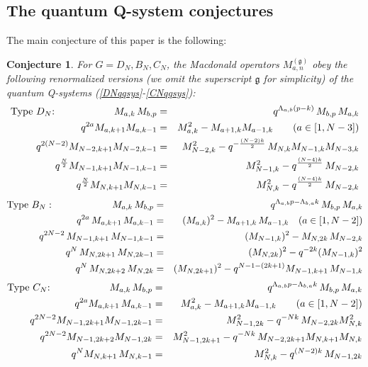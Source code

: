 \documentclass[12pt]{amsart}
\newtheorem{conj}[thm]{Conjecture}
\newcommand{\g}{{\mathfrak{g}}}
\numberwithin{equation}{section}
\numberwithin{table}{section}
\begin{document}
\subsection{The quantum Q-system conjectures}

The main conjecture of this paper is the following:

\begin{conj}\label{qqconj}
For $G=D_N,B_N,C_N$, the Macdonald operators $M_{a,n}^{(\g)}$ obey
the following renormalized versions (we omit the superscript $\g$
for simplicity) of the quantum Q-systems (\ref{DNqqsys}-\ref{CNqqsys}):
\begin{eqnarray}
\hbox{Type $D_N$:}\qquad\qquad\qquad M_{a,k}\, M_{b,p}&=&q^{\Lambda_{a,b}(p-k)}\, M_{b,p}\, M_{a,k}\nonumber \\
q^{2 a}M_{a,k+1}M_{a,k-1}&=&M_{a,k}^2-M_{a+1,k}M_{a-1,k}\qquad (a\in[1,N-3])\nonumber \\
q^{2(N-2)}M_{N-2,k+1}M_{N-2,k-1}&=& M_{N-2,k}^2- q^{-\frac{(N-2)k}{2}}\, M_{N,k}M_{N-1,k}M_{N-3,k}
\label{DMsys} \\
q^{\frac{N}{2}}M_{N-1,k+1}M_{N-1,k-1}&=& M_{N-1,k}^2- q^{\frac{(N-4)k}{2}}\,M_{N-2,k}\nonumber \\
q^{\frac{N}{2}}M_{N,k+1}M_{N,k-1}&=& M_{N,k}^2- q^{\frac{(N-4)k}{2}}\,M_{N-2,k}\nonumber
\end{eqnarray}
\begin{eqnarray}
\hbox{Type $B_N$}:\qquad \qquad\qquad M_{a,k}\, M_{b,p}&=& q^{\Lambda_{a,b} p-\Lambda_{b,a}k}\, M_{b,p}\, M_{a,k}\nonumber \\
q^{2a} \,M_{a,k+1}\,M_{a,k-1}&=&(M_{a,k})^2-M_{a+1,k}\, M_{a-1,k}\quad (a\in [1,N-2])\nonumber \\
q^{2N-2} \,M_{N-1,k+1}\,M_{N-1,k-1}&=&(M_{N-1,k})^2-M_{N,2k}\, M_{N-2,k}\label{BMsysthird} \\
q^N\, M_{N,2k+1}\,M_{N,2k-1}&=& (M_{N,2k})^2 -q^{-2k} (M_{N-1,k})^2\nonumber\\
q^N\, M_{N,2k+2}\,M_{N,2k}&=& (M_{N,2k+1})^2 -q^{N-1-(2k+1)} M_{N-1,k+1}\,M_{N-1,k}\label{BMsyslast}\\
\end{eqnarray}
\begin{eqnarray}
\hbox{Type $C_N$:}\qquad\qquad\qquad M_{a,k}\, M_{b,p}&=&q^{\Lambda_{a,b} p-\Lambda_{b,a}k}\, 
M_{b,p}\,M_{a,k}\nonumber \\
q^{2a} M_{a,k+1}\, M_{a,k-1}&=&M_{a,k}^2- M_{a+1,k}M_{a-1,k} \qquad (a\in[1,N-2])\nonumber \\
q^{2N-2} M_{N-1,2k+1}M_{N-1,2k-1}&=&M_{N-1,2k}^2 - q^{-Nk}\,M_{N-2,2k} M_{N,k}^2\nonumber  \\
q^{2N-2} M_{N-1,2k+2}M_{N-1,2k}&=&M_{N-1,2k+1}^2 - q^{-Nk}\,M_{N-2,2k+1} M_{N,k+1}M_{N,k}\nonumber  \\
q^N M_{N,k+1}\,M_{N,k-1}&=& M_{N,k}^2- q^{(N-2)k}\,M_{N-1,2k}\label{CMsys}
\end{eqnarray}
\end{conj}
\end{document}
